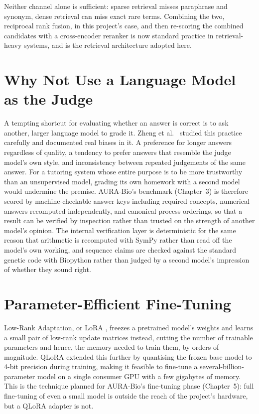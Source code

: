 Neither channel alone is sufficient: sparse retrieval misses paraphrase and
synonym, dense retrieval can miss exact rare terms. Combining the two,
reciprocal rank fusion, in this project's case, and then re-scoring the
combined candidates with a cross-encoder reranker is now standard practice
in retrieval-heavy systems, and is the retrieval architecture adopted here.

\section{Why Not Use a Language Model as the Judge}\label{2.5}

A tempting shortcut for evaluating whether an answer is correct is to ask
another, larger language model to grade it. Zheng et al.\
\cite{zheng2023judging} studied this practice carefully and documented real
biases in it. A preference for longer answers regardless of quality, a
tendency to prefer answers that resemble the judge model's own style, and
inconsistency between repeated judgements of the same answer. For a
tutoring system whose entire purpose is to be more trustworthy than an
unsupervised model, grading its own homework with a second model would
undermine the premise. AURA-Bio's benchmark (Chapter~3) is therefore scored
by machine-checkable answer keys including required concepts, numerical answers
recomputed independently, and canonical process orderings, so that a
result can be verified by inspection rather than trusted on the strength of
another model's opinion. The internal verification layer is deterministic
for the same reason that arithmetic is recomputed with SymPy
\cite{meurer2017sympy} rather than read off the model's own working, and
sequence claims are checked against the standard genetic code with
Biopython \cite{cock2009biopython} rather than judged by a second model's
impression of whether they sound right.

\section{Parameter-Efficient Fine-Tuning}\label{2.6}

Low-Rank Adaptation, or LoRA \cite{hu2021lora}, freezes a pretrained
model's weights and learns a small pair of low-rank update matrices
instead, cutting the number of trainable parameters and hence, the memory
needed to train them, by orders of magnitude. QLoRA
\cite{dettmers2023qlora} extended this further by quantising the frozen
base model to 4-bit precision during training, making it feasible to
fine-tune a several-billion-parameter model on a single consumer GPU with a
few gigabytes of memory. This is the technique planned for AURA-Bio's
fine-tuning phase (Chapter~5): full fine-tuning of even a small model is
outside the reach of the project's hardware, but a QLoRA adapter is not.

